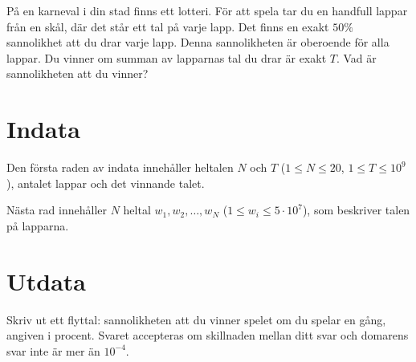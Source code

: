 
På en karneval i din stad finns ett lotteri.
För att spela tar du en handfull lappar från en skål, där det står ett tal på varje lapp.
Det finns en exakt $50\%$ sannolikhet att du drar varje lapp.
Denna sannolikheten är oberoende för alla lappar.
Du vinner om summan av lapparnas tal du drar är exakt $T$.
Vad är sannolikheten att du vinner?

\section*{Indata}
Den första raden av indata innehåller heltalen $N$ och $T$ ($1 \leq N \leq 20$, $1 \leq T \leq 10^9$),
antalet lappar och det vinnande talet.

Nästa rad innehåller $N$ heltal $w_1, w_2, \dots, w_N$ ($1 \leq w_i \leq 5 \cdot 10^7$),
som beskriver talen på lapparna.

\section*{Utdata}
Skriv ut ett flyttal: sannolikheten att du vinner spelet om du spelar en gång, angiven i procent.
Svaret accepteras om skillnaden mellan ditt svar och domarens svar inte är mer än $10^{-4}$.
